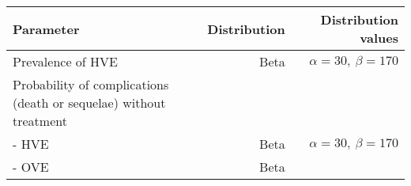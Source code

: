 \documentclass[
]{article}
\begin{document}
\begin{longtable}[]{@{}lrr@{}}
\toprule
\begin{minipage}[b]{0.34\columnwidth}\raggedright
\textbf{Parameter}\strut
\end{minipage} & \begin{minipage}[b]{0.18\columnwidth}\raggedleft
\textbf{Distribution}\strut
\end{minipage} & \begin{minipage}[b]{0.39\columnwidth}\raggedleft
\textbf{Distribution values}\strut
\end{minipage}\tabularnewline
\midrule
\endhead
\begin{minipage}[t]{0.34\columnwidth}\raggedright
Prevalence of HVE\strut
\end{minipage} & \begin{minipage}[t]{0.18\columnwidth}\raggedleft
Beta\strut
\end{minipage} & \begin{minipage}[t]{0.39\columnwidth}\raggedleft
\(\alpha=30, \ \beta=170\)\strut
\end{minipage}\tabularnewline
\begin{minipage}[t]{0.34\columnwidth}\raggedright
Probability of complications (death or sequelae) without treatment\strut
\end{minipage} & \begin{minipage}[t]{0.18\columnwidth}\raggedleft
\strut
\end{minipage} & \begin{minipage}[t]{0.39\columnwidth}\raggedleft
\strut
\end{minipage}\tabularnewline
\begin{minipage}[t]{0.34\columnwidth}\raggedright
- HVE\strut
\end{minipage} & \begin{minipage}[t]{0.18\columnwidth}\raggedleft
Beta\strut
\end{minipage} & \begin{minipage}[t]{0.39\columnwidth}\raggedleft
\(\alpha=30, \ \beta=170\)\strut
\end{minipage}\tabularnewline
\begin{minipage}[t]{0.34\columnwidth}\raggedright
- OVE\strut
\end{minipage} & \begin{minipage}[t]{0.18\columnwidth}\raggedleft
Beta\strut
\end{minipage} & \begin{minipage}[t]{0.39\columnwidth}\raggedleft

\end{minipage}
\end{longtable}
\end{document}
